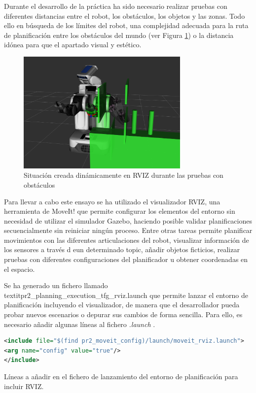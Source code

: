 \documentclass[12pt,spanish,chapterprefix, numbers=noenddot]{book}
\numberwithin{equation}{section}
\numberwithin{figure}{section}
\begin{document}
Durante el desarrollo de la práctica ha sido necesario realizar pruebas con diferentes distancias entre el robot, los obstáculos, los objetos y las zonas. Todo ello en búsqueda de los límites del robot, una complejidad adecuada para la ruta de planificación entre los obstáculos del mundo (ver Figura \ref{fig:rviz}) o la distancia idónea para que el apartado visual y estético. 

\begin{figure}[hbt!]
\centering
\includegraphics[height=6cm]{Figs/RVIZ.png}
\par
\caption{\label{fig:rviz}Situación creada dinámicamente en RVIZ durante las pruebas con obstáculos}
\end{figure}

Para llevar a cabo este ensayo se ha utilizado el visualizador RVIZ, una herramienta de MoveIt! que permite configurar los elementos del entorno sin necesidad de utilizar el simulador Gazebo, haciendo posible validar planificaciones secuencialmente sin reiniciar ningún proceso. Entre otras tareas permite planificar movimientos con las diferentes articulaciones del robot, visualizar información de los sensores a través d eun determinado topic, añadir objetos ficticios, realizar pruebas con diferentes configuraciones del planificador u obtener coordenadas en el espacio. 

Se ha generado un fichero llamado textit{pr2\_planning\_execution\_tfg\_rviz.launch} que permite lanzar el entorno de planificación incluyendo el visualizador, de manera que el desarrollador pueda probar nuevos escenarios o depurar sus cambios de forma sencilla. Para ello, es necesario añadir algunas líneas al fichero \textit{.launch} \cite{planning_rviz}.  %
\vspace{20pt}
\begin{algorithm}[htb!]
	\begin{lstlisting}[breaklines=true,language=xml] 
<include file="$(find pr2_moveit_config)/launch/moveit_rviz.launch">
<arg name="config" value="true"/>
</include>
	\end{lstlisting}
\caption{\label{alg:planning_rviz}Líneas a añadir en el fichero de lanzamiento del entorno de planificación para incluir RVIZ.}
\end{algorithm}
\end{document}

